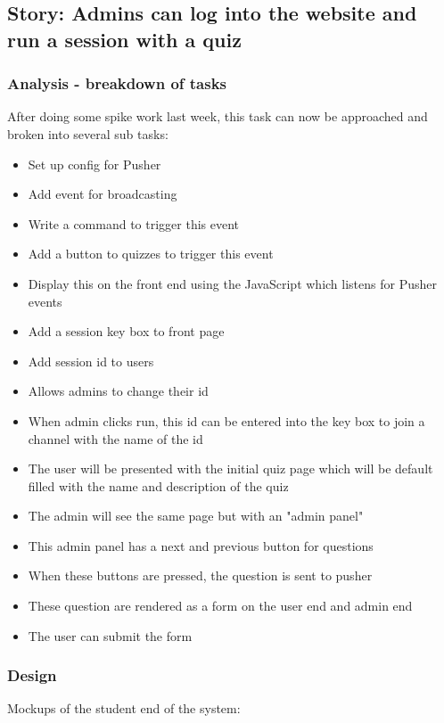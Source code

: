 \subsection{Story: Admins can log into the website and run a session with a quiz}
\subsubsection{Analysis - breakdown of tasks}
After doing some spike work last week, this task can now be approached and broken into several sub tasks:
\begin{itemize}
	\item Set up config for Pusher
	\item Add event for broadcasting
	\item Write a command to trigger this event
	\item Add a button to quizzes to trigger this event
	\item Display this on the front end using the JavaScript which listens for Pusher events
	\item Add a session key box to front page
	\item Add session id to users
	\item Allows admins to change their id
	\item When admin clicks run, this id can be entered into the key box to join a channel with the name of the id
	\item The user will be presented with the initial quiz page which will be default filled with the name and description of the quiz
	\item The admin will see the same page but with an "admin panel"
	\item This admin panel has a next and previous button for questions
	\item When these buttons are pressed, the question is sent to pusher
	\item These question are rendered as a form on the user end and admin end
	\item The user can submit the form
\end{itemize}
\subsubsection{Design}
Mockups of the student end of the system: 

